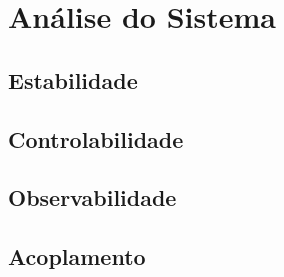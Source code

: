 \section{Análise do Sistema}
\lipsum[1]

\subsection{Estabilidade}
\lipsum[1]

\subsection{Controlabilidade}
\lipsum[1]

\subsection{Observabilidade}
\lipsum[1]

\subsection{Acoplamento}
\lipsum[1]